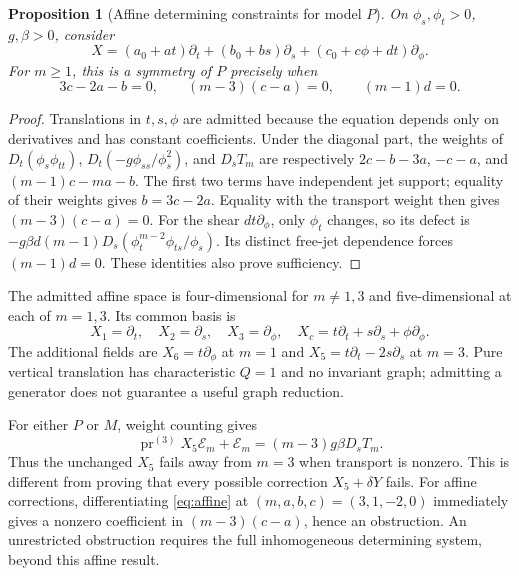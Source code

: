 \documentclass[11pt,a4paper,oneside]{report}
\numberwithin{equation}{chapter}
\newtheorem{proposition}[theorem]{Proposition}
\newcommand{\E}{\mathcal E}
\newcommand{\pr}{\operatorname{pr}}
\begin{document}
\begin{proposition}[Affine determining constraints for model $P$]\label{prop:affine}
On $\phi_s,\phi_t>0$, $g,\beta>0$, consider
\begin{equation}
X=(a_0+at)\partial_t+(b_0+bs)\partial_s
 +(c_0+c\phi+dt)\partial_\phi.
\end{equation}
For $m\ge1$, this is a symmetry of $P$ precisely when
\begin{equation}\label{eq:affine}
3c-2a-b=0,\qquad (m-3)(c-a)=0,\qquad (m-1)d=0.
\end{equation}
\end{proposition}
\begin{proof}
Translations in $t,s,\phi$ are admitted because the equation depends only on derivatives and has constant coefficients. Under the diagonal part, the weights of $D_t(\phi_s\phi_{tt})$, $D_t(-g\phi_{ss}/\phi_s^2)$, and $D_sT_m$ are respectively
$2c-b-3a$, $-c-a$, and $(m-1)c-ma-b$.
The first two terms have independent jet support; equality of their weights gives $b=3c-2a$. Equality with the transport weight then gives $(m-3)(c-a)=0$. For the shear $dt\partial_\phi$, only $\phi_t$ changes, so its defect is
$-g\beta d(m-1)D_s(\phi_t^{m-2}\phi_{ts}/\phi_s)$. Its distinct free-jet dependence forces $(m-1)d=0$. These identities also prove sufficiency.\end{proof}
The admitted affine space is four-dimensional for $m\ne1,3$ and five-dimensional at each of $m=1,3$. Its common basis is
\begin{equation}
X_1=\partial_t,\quad X_2=\partial_s,\quad X_3=\partial_\phi,\quad
X_c=t\partial_t+s\partial_s+\phi\partial_\phi.
\end{equation}
The additional fields are $X_6=t\partial_\phi$ at $m=1$ and $X_5=t\partial_t-2s\partial_s$ at $m=3$. Pure vertical translation has characteristic $Q=1$ and no invariant graph; admitting a generator does not guarantee a useful graph reduction.



For either $P$ or $M$, weight counting gives
\begin{equation}\label{eq:breaking}
\pr^{(3)}X_5\E_m+\E_m=(m-3)g\beta D_sT_m.
\end{equation}
Thus the unchanged $X_5$ fails away from $m=3$ when transport is nonzero. This is different from proving that every possible correction $X_5+\delta Y$ fails. For affine corrections, differentiating \eqref{eq:affine} at $(m,a,b,c)=(3,1,-2,0)$ immediately gives a nonzero coefficient in $(m-3)(c-a)$, hence an obstruction. An unrestricted obstruction requires the full inhomogeneous determining system, beyond this affine result.
\end{document}
